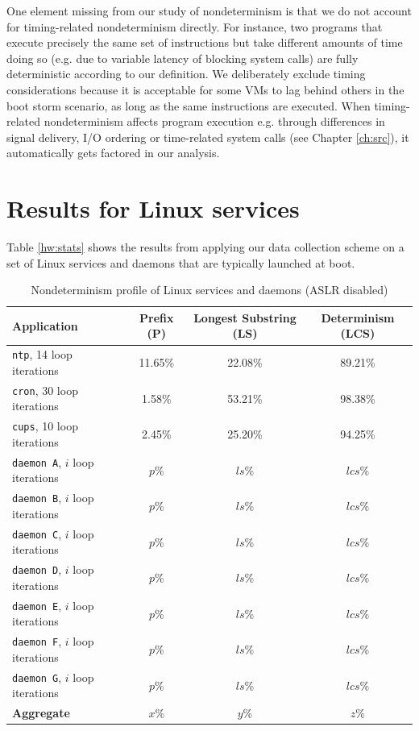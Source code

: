 One element missing from our study of nondeterminism is that
we do not account for timing-related
nondeterminism directly. For instance, two programs
that execute precisely the same set of instructions but 
take different amounts of time doing so (e.g. due
to variable latency of blocking system calls) are
fully deterministic according to our definition.
We deliberately exclude timing considerations because
it is acceptable for some VMs to lag behind others in the boot storm
scenario, as long as the same instructions are executed.
When timing-related nondeterminism affects program execution
e.g. through differences in signal delivery, I/O ordering
or time-related system calls (see Chapter \ref{ch:src}),
it automatically gets factored in our analysis.

\section{Results for Linux services} \label{bootresults}
Table \ref{hw:stats} shows the results from applying our data
collection scheme on a set of Linux services and daemons
that are typically launched at boot. 

\begin{table}[h]
\caption{Nondeterminism profile of Linux services and daemons (ASLR disabled)}
\label{linux:stats}
\begin{center}
\begin{tabular}{||l|c|c|c||}\hline
  Application & Prefix (P) & Longest Substring (LS) &
  Determinism (LCS) \\
  \hline \hline
  \texttt{ntp}, 14 loop iterations & 11.65\% & 22.08\% & 89.21\%
  \\\hline
  \texttt{cron}, 30 loop iterations & 1.58\% & 53.21\% & 98.38\% 
  \\\hline 
  \texttt{cups}, 10 loop iterations & 2.45\% & 25.20\% & 94.25\%
  \\\hline 
  \texttt{daemon A}, $i$ loop iterations & $p$\% & $ls$\% & $lcs$\%
  \\\hline 
  \texttt{daemon B}, $i$ loop iterations & $p$\% & $ls$\% & $lcs$\%
  \\\hline 
  \texttt{daemon C}, $i$ loop iterations & $p$\% & $ls$\% & $lcs$\%
  \\\hline 
  \texttt{daemon D}, $i$ loop iterations & $p$\% & $ls$\% & $lcs$\%
  \\\hline 
  \texttt{daemon E}, $i$ loop iterations & $p$\% & $ls$\% & $lcs$\%
  \\\hline 
  \texttt{daemon F}, $i$ loop iterations & $p$\% & $ls$\% & $lcs$\%
  \\\hline 
  \texttt{daemon G}, $i$ loop iterations & $p$\% & $ls$\% & $lcs$\%
  \\\hline 
  \hline 
  {\bf Aggregate} & {\bf $x$}\% & {\bf $y$}\% & {\bf $z$}\%
  \\\hline 

\end{tabular}
\end{center}
\end{table}

